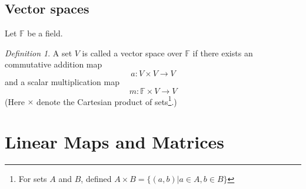 \documentclass[12pt]{amsart}
\newcommand{\fff}[0]{\mathbb{F}}
\theoremstyle{remark}
\newtheorem{definition}[theorem]{Definition}
\numberwithin{equation}{section}
\begin{document}
\subsection{Vector spaces}
Let $\fff$ be a field.
\begin{definition}
	A set $V$ is called a vector space over $\fff$ if there exists an commutative addition map
	\[a:V\times V\to V\]
	and a scalar multiplication map
	\[m:\fff\times V\to V\]
	(Here $\times$ denote the Cartesian product of sets\footnote{For sets $A$ and $B$, defined $A\times B=\{(a,b)|a\in A,b\in B\}$}.)
	
\end{definition}



\section{Linear Maps and Matrices}
\end{document}
